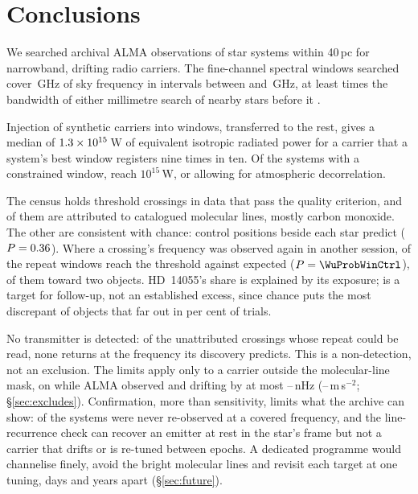 \section{Conclusions}
\label{sec:conclusions}

We searched archival ALMA observations of \NSysClassA{} star systems within
40\,pc for narrowband, drifting radio carriers. The fine-channel spectral
windows searched cover \CvUnionA\,GHz of sky frequency in \CovNIslands{}
intervals between \SurvFreqLoA{} and \SurvFreqHiA\,GHz, at least
\SbPriorRatio{} times the bandwidth of either millimetre search of
nearby stars before it \citep{Steffes1994,Mauersberger1996}.

Injection of synthetic carriers into \SensNInj{} windows, transferred to the
rest, gives a median of $1.3\times10^{15}$\,W of equivalent isotropic
radiated power for a carrier that a system's best window registers nine times
in ten. Of the \NSysALim{} systems with a constrained window, \NSysEfifteen{}
reach $10^{15}$\,W, or \NmDecAdjNEfifteen{} allowing for atmospheric
decorrelation.

The census holds \CsNCrossQp{} threshold crossings in data that pass the
quality criterion, and \CsNAttrQp{} of them are attributed to catalogued
molecular lines, mostly carbon monoxide. The other \CsNUnattrQp{} are
consistent with chance: control positions beside
each star predict \CeExp{} ($P=0.36$). Where a crossing's frequency was
observed again in another session, \WuNWinExc{} of the \WuNWin{} repeat windows reach the
threshold against \WuExpWinCtrl{} expected ($P=\WuProbWinCtrl$), \TwNWinExcTwoWord{} of
them toward two objects. HD~14055's share is explained by its exposure;
\BkAlmaName{} is a target for follow-up, not an established excess, since
chance puts the most discrepant of \TwLookNStarCtrl{} objects that far out in
\TwLookPctCtrl{} per cent of trials.

No transmitter is detected: of the unattributed crossings whose repeat could
be read, none returns at the frequency its discovery predicts. This is a non-detection,
not an exclusion. The limits apply only to a carrier outside the
molecular-line mask, on while ALMA observed and drifting by at most
\DriftCeilLo--\DriftCeilHi\,nHz (\AccelCeilMed--\AccelCeilMax\,m\,s$^{-2}$;
\S\ref{sec:excludes}). Confirmation, more than sensitivity, limits what the archive can show:
\ZcNoRepSys{} of the \NSysClassA{} systems were never re-observed at a covered
frequency, and the line-recurrence check can recover an emitter at rest in
the star's frame but not a carrier that drifts or is re-tuned between epochs. A dedicated
programme would channelise finely, avoid the bright molecular lines and
revisit each target at one tuning, days and years apart (\S\ref{sec:future}).

